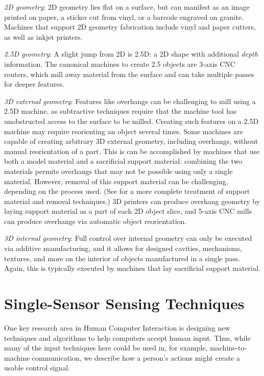 \emph{2D geometry}: 2D geometry lies flat on a surface, but can manifest as an image printed on paper, a sticker cut from vinyl, or a barcode engraved on granite. Machines that support 2D geometry fabrication include vinyl and paper cutters, as well as inkjet printers.

\emph{2.5D geometry}: A slight jump from 2D is 2.5D: a 2D shape with additional \emph{depth} information. The canonical machines to create 2.5 objects are 3-axis CNC routers, which mill away material from the surface and can take multiple passes for deeper features.

\emph{3D external geometry}: Features like overhangs can be challenging to mill using a 2.5D machine, as subtractive techniques require that the machine tool has unobstructed access to the surface to be milled. Creating such features on a 2.5D machine may require reorienting an object several times. Some machines are capable of creating arbitrary 3D external geometry, including overhangs, without manual reorientation of a part. This is can be accomplished by machines that use both a model material and a sacrificial support material: combining the two materials permits overhangs that may not be possible using only a single material. However, removal of this support material can be challenging, depending on the process used. (See \cite{savage-sot} for a more complete treatment of support material and removal techniques.) 3D printers can produce overhang geometry by laying support material as a part of each 2D object slice, and 5-axis CNC mills can produce overhangs via automatic object reorientation.

\emph{3D internal geometry}: Full control over internal geometry can only be executed via additive manufacturing, and it allows for designed cavities, mechanisms, textures, and more on the interior of objects manufactured in a single pass. Again, this is typically executed by machines that lay sacrificial support material.

\section{Single-Sensor Sensing Techniques}

One key research area in Human Computer Interaction is designing new techniques and algorithms to help computers accept human input. Thus, while many of the input techniques here could be used in, for example, machine-to-machine communication, we describe how a person's actions might create a usable control signal.

